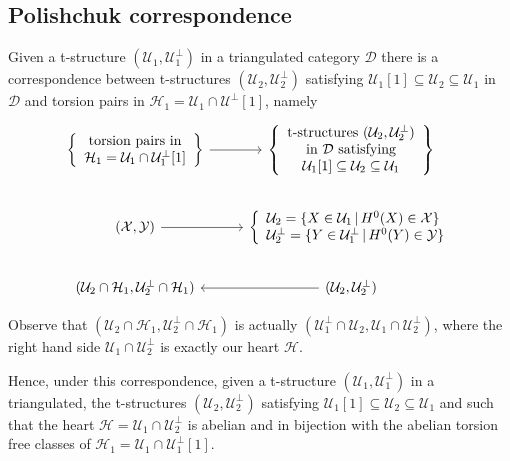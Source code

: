 \subsection{Polishchuk correspondence}

Given a t-structure $(\mathcal{U}_1,\mathcal{U}_1^\perp)$ in a triangulated category $\mathcal{D}$ there is
a correspondence between t-structures $(\mathcal{U}_2,\mathcal{U}_2^\perp)$ satisfying $\mathcal{U}_1[1]\subseteq \mathcal{U}_2\subseteq\mathcal{U}_1$
in $\mathcal{D}$ and torsion pairs in $\mathcal{H}_1=\mathcal{U}_1\cap\mathcal{U}^\perp[1]$, namely
\begin{equation*}
  \begin{tikzcd}
    \left\{
    \begin{array}{c}
      \text{torsion pairs in} \\
      \mathcal{H}_1=\mathcal{U}_1\cap \mathcal{U}_1^\perp[1]
    \end{array}
    \right\}
    \arrow{r}
      &
      \left\{
        \begin{array}{c}
          \text{t-structures }
          (\mathcal{U}_2,\mathcal{U}_2^\perp) \\
          \text{ in } \mathcal{D}
          \text{ satisfying } \\ \mathcal{U}_1[1]\subseteq \mathcal{U}_2\subseteq\mathcal{U}_1
        \end{array}
      \right\}\\
    (\mathcal{X},\mathcal{Y})\arrow{r}
      &
      \left\{
        \begin{array}{l}
          \mathcal{U}_2 = \{X\in\mathcal{U}_1\,|\,H^0(X)\in\mathcal{X}\}\\
          \mathcal{U}_2^\perp = \{Y\in\mathcal{U}_1^\perp\,|\,H^0(Y)\in\mathcal{Y}\}
        \end{array}
      \right. \\
    (\mathcal{U}_2\cap\mathcal{H}_1,\mathcal{U}_2^\perp\cap\mathcal{H}_1)
      & (\mathcal{U}_2,\mathcal{U}_2^\perp)\arrow{l}
  \end{tikzcd}
\end{equation*}

Observe that $(\mathcal{U}_2\cap\mathcal{H}_1,\mathcal{U}_2^\perp\cap\mathcal{H}_1)$
is actually $(\mathcal{U}_1^\perp\cap\mathcal{U}_2, \mathcal{U}_1\cap\mathcal{U}_2^\perp)$, where
the right hand side $\mathcal{U}_1\cap\mathcal{U}_2^\perp$ is exactly our heart $\mathcal{H}$.

Hence, under this correspondence, given a t-structure $(\mathcal{U}_1,\mathcal{U}_1^\perp)$
in a triangulated, the t-structures $(\mathcal{U}_2,\mathcal{U}_2^\perp)$ satisfying
$\mathcal{U}_1[1]\subseteq \mathcal{U}_2\subseteq\mathcal{U}_1$ and such that the
heart $\mathcal{H}=\mathcal{U}_1\cap\mathcal{U}_2^\perp$ is abelian and in bijection
with the abelian torsion free classes of $\mathcal{H}_1=\mathcal{U}_1\cap\mathcal{U}_1^\perp[1]$.

